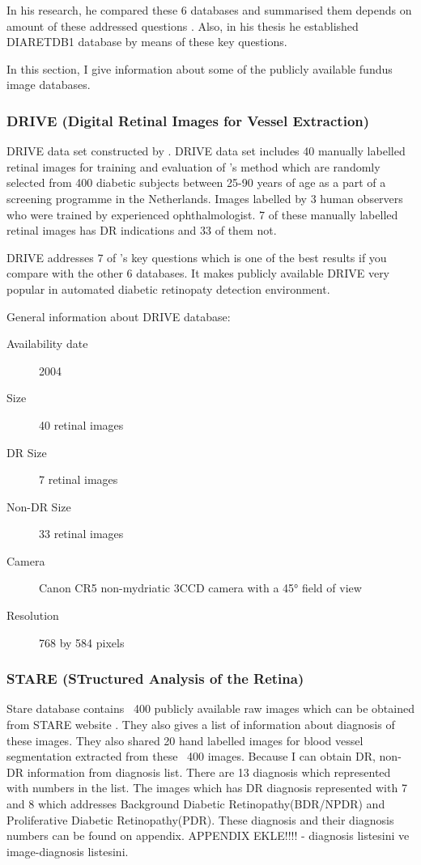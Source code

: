 In his research, he compared these 6 databases and summarised them depends on amount of these addressed questions \citep{kauppi2013constructing}. Also, in his thesis he established DIARETDB1 database by means of these key questions.

In this section, I give information about some of the publicly available fundus image databases.

\subsubsection{DRIVE (Digital Retinal Images for Vessel Extraction)}
DRIVE data set constructed by \citet{staal2004ridge}.
DRIVE data set includes 40 manually labelled retinal images for training and evaluation of \citet{staal2004ridge}'s method which are randomly selected from 400 diabetic subjects between 25-90 years of age as a part of a screening programme in the Netherlands. Images labelled by 3 human observers who were trained by experienced ophthalmologist. 7 of these manually labelled retinal images has DR indications and 33 of them not. 

DRIVE addresses 7 of \citet{kauppi2013constructing}'s key questions which is one of the best results if you compare with the other 6 databases. It makes publicly available DRIVE very popular in automated diabetic retinopaty detection environment.

General information about DRIVE database:
\begin{description}
    \item[Availability date] 2004
    \item[Size] 40 retinal images
    \item[DR Size] 7 retinal images
    \item[Non-DR Size] 33 retinal images
    \item[Camera] Canon CR5 non-mydriatic 3CCD camera with a 45° field of view
    \item[Resolution] 768 by 584 pixels
\end{description}

\subsubsection{STARE (STructured Analysis of the Retina)}
Stare database contains ~400 publicly available raw images which can be obtained from STARE website \citep{STARE}. They also gives a list of information about diagnosis of these images. They also shared 20 hand labelled images for blood vessel segmentation \citep{hoover2000locating} extracted from these ~400 images. Because I can obtain DR, non-DR information from diagnosis list. There are 13 diagnosis which represented with numbers in the list. The images which has DR diagnosis represented with 7 and 8 which addresses Background Diabetic Retinopathy(BDR/NPDR) and Proliferative Diabetic Retinopathy(PDR). These diagnosis and their diagnosis numbers can be found on appendix. {APPENDIX EKLE!!!!} - diagnosis listesini ve image-diagnosis listesini.

